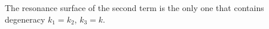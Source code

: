 
The resonance surface of the second term is the only one that contains degeneracy $k_1=k_2$, $k_3=k$.




